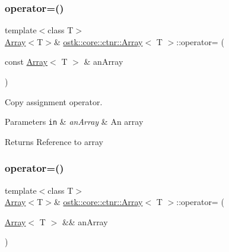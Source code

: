 \subsubsection{\texorpdfstring{operator=()}{operator=()}\hspace{0.1cm}{\footnotesize\ttfamily [1/2]}}
{\footnotesize\ttfamily template$<$class T$>$ \\
\hyperlink{classostk_1_1core_1_1ctnr_1_1_array}{Array}$<$T$>$\& \hyperlink{classostk_1_1core_1_1ctnr_1_1_array}{ostk\+::core\+::ctnr\+::\+Array}$<$ T $>$\+::operator= (\begin{DoxyParamCaption}\item[{const \hyperlink{classostk_1_1core_1_1ctnr_1_1_array}{Array}$<$ T $>$ \&}]{an\+Array }\end{DoxyParamCaption})\hspace{0.3cm}{\ttfamily [default]}}



Copy assignment operator. 


\begin{DoxyParams}[1]{Parameters}
\mbox{\tt in}  & {\em an\+Array} & An array \\
\hline
\end{DoxyParams}
\begin{DoxyReturn}{Returns}
Reference to array 
\end{DoxyReturn}
\mbox{\label{classostk_1_1core_1_1ctnr_1_1_array_a1d596aae830a46ce368d8a6cfdeba722}} 
\subsubsection{\texorpdfstring{operator=()}{operator=()}\hspace{0.1cm}{\footnotesize\ttfamily [2/2]}}
{\footnotesize\ttfamily template$<$class T$>$ \\
\hyperlink{classostk_1_1core_1_1ctnr_1_1_array}{Array}$<$T$>$\& \hyperlink{classostk_1_1core_1_1ctnr_1_1_array}{ostk\+::core\+::ctnr\+::\+Array}$<$ T $>$\+::operator= (\begin{DoxyParamCaption}\item[{\hyperlink{classostk_1_1core_1_1ctnr_1_1_array}{Array}$<$ T $>$ \&\&}]{an\+Array }\end{DoxyParamCaption})\hspace{0.3cm}{\ttfamily [default]}}



